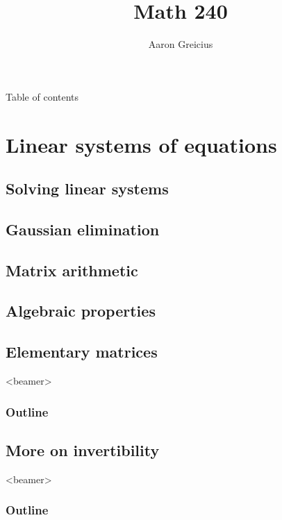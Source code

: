 \documentclass[handout,envcountsect,hyperref={colorlinks},notheorems]{beamer}
\title{Math 240}
\author{Aaron Greicius}
\date{}
\institute{Northwestern University}
\theoremstyle{definition}
\theoremstyle{named}
\numberwithin{myalgctr}{section}
\begin{document}
\begin{frame}
\maketitle
\end{frame}
\begin{frame}[allowframebreaks]{Table of contents}
\footnotesize
\tableofcontents[sections={1-3}]
    \framebreak
  \tableofcontents[sections={4-5}]
\end{frame}
\footnotesize
\section{Linear systems of equations}\label{s:linear systems}
\subsection{Solving linear systems}\label{ss:solving}

\subsection{Gaussian elimination}\label{ss:ge}

\subsection{Matrix arithmetic}\label{ss:matrix}

\subsection{Algebraic properties}\label{ss:algebraic}

\subsection{Elementary matrices}\label{ss:elementary}
\begin{frame}<beamer>
             \frametitle{Outline}
           \end{frame}

\subsection{More on invertibility}\label{ss:invertible}
\begin{frame}<beamer>
             \frametitle{Outline}
           \end{frame}

\end{document}
